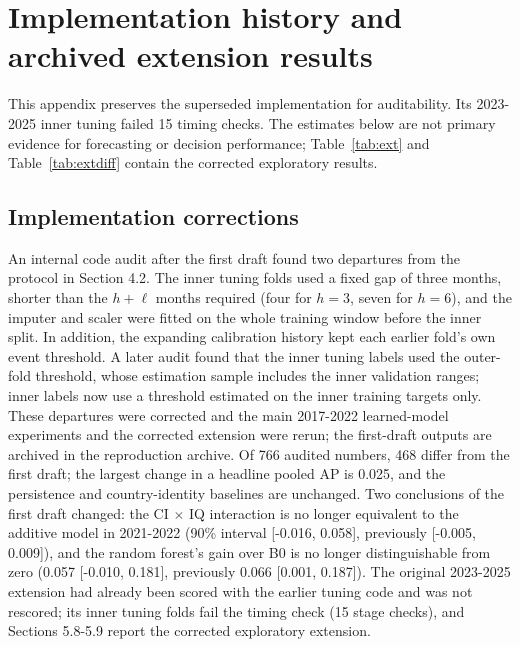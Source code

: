 \documentclass[preprint,12pt,authoryear]{elsarticle}
\begin{document}
\appendix
\section{Implementation history and archived extension results}
\setcounter{table}{0}
\renewcommand{\thesubsection}{A\arabic{subsection}}
This appendix preserves the superseded implementation for auditability. Its 2023-2025 inner tuning failed 15 timing checks. The estimates below are not primary evidence for forecasting or decision performance; Table~\ref{tab:ext} and Table~\ref{tab:extdiff} contain the corrected exploratory results.

\subsection{Implementation corrections}
An internal code audit after the first draft found two departures from the protocol in Section 4.2. The inner tuning folds used a fixed gap of three months, shorter than the $h + \ell$ months required (four for $h = 3$, seven for $h = 6$), and the imputer and scaler were fitted on the whole training window before the inner split. In addition, the expanding calibration history kept each earlier fold's own event threshold. A later audit found that the inner tuning labels used the outer-fold threshold, whose estimation sample includes the inner validation ranges; inner labels now use a threshold estimated on the inner training targets only. These departures were corrected and the main 2017-2022 learned-model experiments and the corrected extension were rerun; the first-draft outputs are archived in the reproduction archive. Of 766 audited numbers, 468 differ from the first draft; the largest change in a headline pooled AP is 0.025, and the persistence and country-identity baselines are unchanged. Two conclusions of the first draft changed: the CI $\times$ IQ interaction is no longer equivalent to the additive model in 2021-2022 (90\% interval [-0.016, 0.058], previously [-0.005, 0.009]), and the random forest's gain over B0 is no longer distinguishable from zero (0.057 [-0.010, 0.181], previously 0.066 [0.001, 0.187]). The original 2023-2025 extension had already been scored with the earlier tuning code and was not rescored; its inner tuning folds fail the timing check (15 stage checks), and Sections 5.8-5.9 report the corrected exploratory extension.
\end{document}
